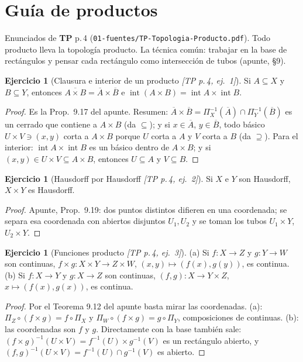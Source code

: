 \documentclass[11pt,a4paper]{article}
\theoremstyle{definition}
\newtheorem{ejercicio}[definicion]{Ejercicio}
\theoremstyle{plain}
\newcommand{\fnt}[1]{{\normalfont\small\itshape\color{gray!150!black}[#1]}}
\newcommand{\cl}[1]{\overline{#1}}
\newcommand{\intr}{\operatorname{int}}
\begin{document}
\section{Guía de productos}

\noindent Enunciados de \textbf{TP} p.\,4 (\texttt{01-fuentes/TP-Topologia-Producto.pdf}). Todo producto lleva la topología producto. La técnica común: trabajar en la base de rectángulos y pensar cada rectángulo como intersección de tubos (apunte, \S9).

\begin{ejercicio}[Clausura e interior de un producto \fnt{TP p.\,4, ej.\ 1}]
Si $A\subseteq X$ y $B\subseteq Y$, entonces $\cl{A\times B}=\cl A\times\cl B$ e $\intr(A\times B)=\intr A\times\intr B$.
\end{ejercicio}

\begin{proof}
Es la Prop.\ 9.17 del apunte. Resumen: $\cl A\times\cl B=\Pi_X^{-1}(\cl A)\cap\Pi_Y^{-1}(\cl B)$ es un cerrado que contiene a $A\times B$ (da $\subseteq$); y si $x\in\cl A$, $y\in\cl B$, todo básico $U\times V\ni(x,y)$ corta a $A\times B$ porque $U$ corta a $A$ y $V$ corta a $B$ (da $\supseteq$). Para el interior: $\intr A\times\intr B$ es un básico dentro de $A\times B$; y si $(x,y)\in U\times V\subseteq A\times B$, entonces $U\subseteq A$ y $V\subseteq B$.
\end{proof}

\begin{ejercicio}[Hausdorff por Hausdorff \fnt{TP p.\,4, ej.\ 2}]
Si $X$ e $Y$ son Hausdorff, $X\times Y$ es Hausdorff.
\end{ejercicio}

\begin{proof}
Apunte, Prop.\ 9.19: dos puntos distintos difieren en una coordenada; se separa esa coordenada con abiertos disjuntos $U_1,U_2$ y se toman los tubos $U_1\times Y$, $U_2\times Y$.
\end{proof}

\begin{ejercicio}[Funciones producto \fnt{TP p.\,4, ej.\ 3}]
(a) Si $f:X\to Z$ y $g:Y\to W$ son continuas, $f\times g:X\times Y\to Z\times W$, $(x,y)\mapsto(f(x),g(y))$, es continua. (b) Si $f:X\to Y$ y $g:X\to Z$ son continuas, $(f,g):X\to Y\times Z$, $x\mapsto(f(x),g(x))$, es continua.
\end{ejercicio}

\begin{proof}
Por el Teorema 9.12 del apunte basta mirar las coordenadas. (a): $\Pi_Z\circ(f\times g)=f\circ\Pi_X$ y $\Pi_W\circ(f\times g)=g\circ\Pi_Y$, composiciones de continuas. (b): las coordenadas son $f$ y $g$. Directamente con la base también sale: $(f\times g)^{-1}(U\times V)=f^{-1}(U)\times g^{-1}(V)$ es un rectángulo abierto, y $(f,g)^{-1}(U\times V)=f^{-1}(U)\cap g^{-1}(V)$ es abierto.
\end{proof}
\end{document}
